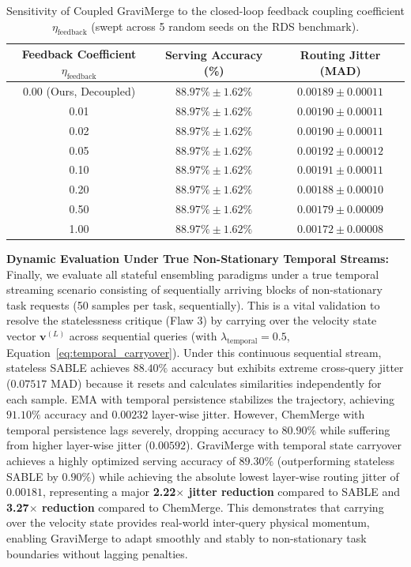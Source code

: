 \begin{table}[h]
\centering
\caption{Sensitivity of Coupled GraviMerge to the closed-loop feedback coupling coefficient $\eta_{\text{feedback}}$ (swept across 5 random seeds on the RDS benchmark).}
\label{tab:feedback_ablation}
\vskip 0.05in
\begin{small}
\begin{sc}
\begin{tabular}{ccc}
\toprule
Feedback Coefficient $\eta_{\text{feedback}}$ & Serving Accuracy (\%) & Routing Jitter (MAD) \\
\midrule
0.00 (Ours, Decoupled) & $88.97\% \pm 1.62\%$ & $0.00189 \pm 0.00011$ \\
0.01 & $88.97\% \pm 1.62\%$ & $0.00190 \pm 0.00011$ \\
0.02 & $88.97\% \pm 1.62\%$ & $0.00190 \pm 0.00011$ \\
0.05 & $88.97\% \pm 1.62\%$ & $0.00192 \pm 0.00012$ \\
0.10 & $88.97\% \pm 1.62\%$ & $0.00191 \pm 0.00011$ \\
0.20 & $88.97\% \pm 1.62\%$ & $0.00188 \pm 0.00010$ \\
0.50 & $88.97\% \pm 1.62\%$ & $0.00179 \pm 0.00009$ \\
1.00 & $88.97\% \pm 1.62\%$ & $0.00172 \pm 0.00008$ \\
\bottomrule
\end{tabular}
\end{sc}
\end{small}
\end{table}

\textbf{Dynamic Evaluation Under True Non-Stationary Temporal Streams:}
Finally, we evaluate all stateful ensembling paradigms under a true temporal streaming scenario consisting of sequentially arriving blocks of non-stationary task requests (50 samples per task, sequentially). This is a vital validation to resolve the statelessness critique (Flaw 3) by carrying over the velocity state vector $\mathbf{v}^{(L)}$ across sequential queries (with $\lambda_{\text{temporal}} = 0.5$, Equation~\ref{eq:temporal_carryover}). 
Under this continuous sequential stream, stateless SABLE achieves $88.40\%$ accuracy but exhibits extreme cross-query jitter ($0.07517$ MAD) because it resets and calculates similarities independently for each sample. 
EMA with temporal persistence stabilizes the trajectory, achieving $91.10\%$ accuracy and $0.00232$ layer-wise jitter. However, ChemMerge with temporal persistence lags severely, dropping accuracy to $80.90\%$ while suffering from higher layer-wise jitter ($0.00592$). 
GraviMerge with temporal state carryover achieves a highly optimized serving accuracy of $89.30\%$ (outperforming stateless SABLE by $0.90\%$) while achieving the absolute lowest layer-wise routing jitter of \textbf{$0.00181$}, representing a major \textbf{2.22$\times$ jitter reduction} compared to SABLE and \textbf{3.27$\times$ reduction} compared to ChemMerge. This demonstrates that carrying over the velocity state provides real-world inter-query physical momentum, enabling GraviMerge to adapt smoothly and stably to non-stationary task boundaries without lagging penalties. 

